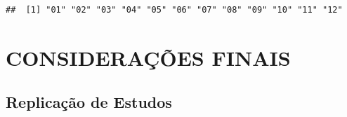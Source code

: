 \documentclass[12pt,12pt,openright,oneside,a4paper,chapter=TITLE,section=TITLE,subsection=TITLE,subsubsection=TITLE,english,french,spanish,portugues,sumario=tradicional]{abntex2}
\begin{document}
\begin{verbatim}
##  [1] "01" "02" "03" "04" "05" "06" "07" "08" "09" "10" "11" "12"
\end{verbatim}


\chapter*[Conclusão]{CONSIDERAÇÕES FINAIS}

\postextual


\postextual


{\begin{apendicesenv}

\renewcommand{\thechapter}{\arabic{chapter}}

\chapter{Replicação de Estudos}
\section{}
 
\end{apendicesenv}
}{}



\printbibliography
\end{document}

